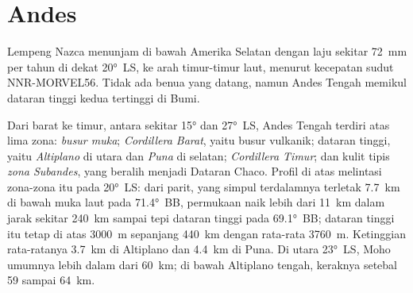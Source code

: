 \section{Andes}\label{sec:b2:himalaya-andes:andes}

Lempeng Nazca menunjam di bawah Amerika Selatan dengan laju sekitar \qty{72}{mm} per tahun di dekat
\ang{20}~LS, ke arah timur-timur laut, menurut kecepatan sudut NNR-MORVEL56. Tidak ada benua
yang datang, namun Andes Tengah memikul dataran tinggi kedua tertinggi di Bumi.

Dari barat ke timur, antara sekitar \ang{15} dan \ang{27}~LS, Andes Tengah terdiri atas lima zona:
\emph{busur muka}; \emph{Cordillera Barat}, yaitu busur vulkanik; dataran tinggi, yaitu
\emph{Altiplano} di utara dan \emph{Puna} di selatan; \emph{Cordillera
Timur}; dan  kulit tipis \emph{zona Subandes}, yang
beralih menjadi Dataran Chaco. Profil di atas melintasi zona-zona itu pada \ang{20}~LS: dari parit,
yang simpul terdalamnya terletak \qty{7.7}{km} di bawah muka laut pada \ang{71.4}~BB, permukaan naik
lebih dari \qty{11}{km} dalam jarak sekitar \qty{240}{km} sampai tepi dataran tinggi pada \ang{69.1}~BB;
dataran tinggi itu tetap di atas \qty{3000}{m} sepanjang \qty{440}{km} dengan
rata-rata \qty{3760}{m}. Ketinggian rata-ratanya \qty{3.7}{km} di Altiplano dan \qty{4.4}{km} di
Puna. Di utara \ang{23}~LS, Moho umumnya lebih dalam dari \qty{60}{km}; di bawah
Altiplano tengah, keraknya setebal 59 sampai \qty{64}{km}.


